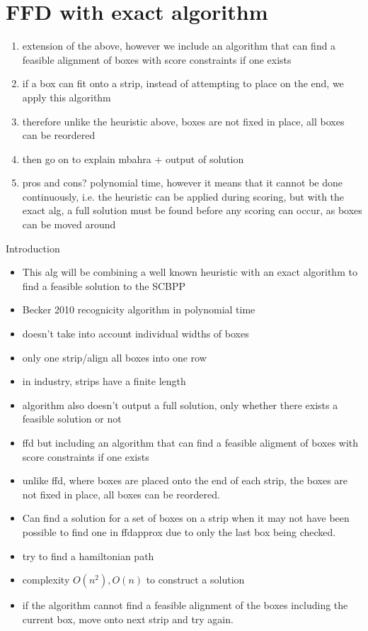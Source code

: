 \documentclass{llncs}
\begin{document}
\section{FFD with exact algorithm}
\begin{enumerate}
	\item extension of the above, however we include an algorithm that can find a feasible alignment of boxes with score constraints if one exists
	\item if a box can fit onto a strip, instead of attempting to place on the end, we apply this algorithm
	\item therefore unlike the heuristic above, boxes are not fixed in place, all boxes can be reordered
	\item then go on to explain mbahra + output of solution
	\item pros and cons? polynomial time, however it means that it cannot be done continuously, i.e. the heuristic can be applied during scoring, but with the exact alg, a full solution must be found before any scoring can occur, as boxes can be moved around
\end{enumerate}

Introduction
\begin{itemize}
	\item This alg will be combining a well known heuristic with an exact algorithm to find a feasible solution to the SCBPP
	\item Becker 2010 recognicity algorithm in polynomial time
	\item doesn't take into account individual widths of boxes
	\item only one strip/align all boxes into one row
	\item in industry, strips have a finite length
	\item algorithm also doesn't output a full solution, only whether there exists a feasible solution or not
	\item ffd but including an algorithm that can find a feasible aligment of boxes with score constraints if one exists
	\item unlike ffd, where boxes are placed onto the end of each strip, the boxes are not fixed in place, all boxes can be reordered.
	\item Can find a solution for a set of boxes on a strip when it may not have been possible to find one in ffdapprox due to only the last box being checked.
	\item try to find a hamiltonian path 
	\item complexity $O(n^2), O(n)$ to construct a solution
	\item if the algorithm cannot find a feasible alignment of the boxes including the current box, move onto next strip and try again.
\end{itemize}
\end{document}
